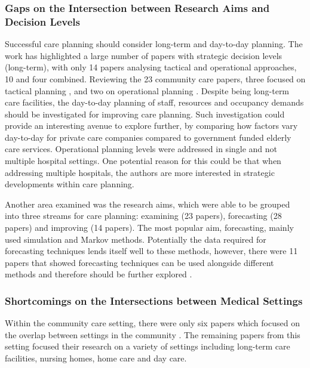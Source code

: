 \documentclass[../thesis.tex]{subfiles}
\begin{document}
\subsubsection{Gaps on the Intersection between Research Aims and Decision Levels}
Successful care planning should consider long-term and day-to-day planning. The work has highlighted a large number of papers with strategic decision levels (long-term), with only 14 papers analysing tactical and operational approaches, 10 and four combined. Reviewing the 23 community care papers, three focused on tactical planning \cite{Borowiak, Eggink, Yalcindag}, and two on operational planning \cite{Eveborn, Grenouilleau}. Despite being long-term care facilities, the day-to-day planning of staff, resources and occupancy demands should be investigated for improving care planning. Such investigation could provide an interesting avenue to explore further, by comparing how factors vary day-to-day for private care companies compared to government funded elderly care services. Operational planning levels were addressed in single and not multiple hospital settings. One potential reason for this could be that when addressing multiple hospitals, the authors are more interested in strategic developments within care planning.

Another area examined was the research aims, which were able to be grouped into three streams for care planning: examining (23 papers), forecasting (28 papers) and improving (14 papers).
The most popular aim, forecasting, mainly used simulation and Markov methods. Potentially the data required for forecasting techniques lends itself well to these methods, however, there were 11 papers that showed forecasting techniques can be used alongside different methods and therefore should be further explored \cite{Abe,Arling,Borowiak, Davari,Desai, Grenouilleau, Gorunescu, Johnson,Lim, Bidhandi,Yalcindag}.
 
\subsubsection{Shortcomings on the Intersections between Medical Settings}

Within the community care setting, there were only six papers which focused on the overlap between settings in the community \cite{Bae, Gassoumis, YLi,Bidhandi,Welberry, Zhang1}. The remaining papers from this setting focused their research on a variety of settings including long-term care facilities, nursing homes, home care and day care.
\end{document}
